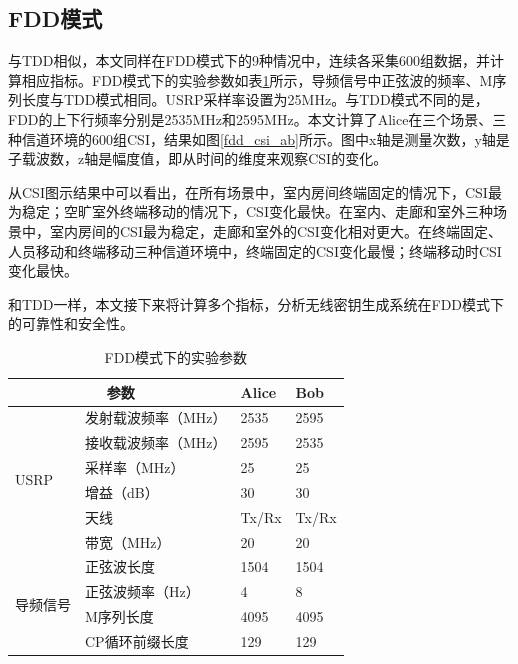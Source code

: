 \documentclass[master]{seuthesis} %
\begin{document}
\begin{Main}
\section{FDD模式}

与TDD相似，本文同样在FDD模式下的9种情况中，连续各采集600组数据，并计算相应指标。FDD模式下的实验参数如表\ref{fdd-exp-args}所示，导频信号中正弦波的频率、M序列长度与TDD模式相同。USRP采样率设置为25MHz。与TDD模式不同的是，FDD的上下行频率分别是2535MHz和2595MHz。本文计算了Alice在三个场景、三种信道环境的600组CSI，结果如图\ref{fdd_csi_ab}所示。图中x轴是测量次数，y轴是子载波数，z轴是幅度值，即从时间的维度来观察CSI的变化。

从CSI图示结果中可以看出，在所有场景中，室内房间终端固定的情况下，CSI最为稳定；空旷室外终端移动的情况下，CSI变化最快。在室内、走廊和室外三种场景中，室内房间的CSI最为稳定，走廊和室外的CSI变化相对更大。在终端固定、人员移动和终端移动三种信道环境中，终端固定的CSI变化最慢；终端移动时CSI变化最快。

和TDD一样，本文接下来将计算多个指标，分析无线密钥生成系统在FDD模式下的可靠性和安全性。

\begin{table}[]
    \centering
    \begin{tabular}{|l|l|l|l|}
    \hline
    \multicolumn{2}{|c|}{参数} & Alice & Bob \\ \hline
    \multirow{6}{*}{USRP} & 发射载波频率（MHz） & 2535 & 2595 \\ \cline{2-4} 
     & 接收载波频率（MHz） & 2595 & 2535 \\ \cline{2-4} 
     & 采样率（MHz） & 25 & 25 \\ \cline{2-4} 
     & 增益（dB） & 30 & 30 \\ \cline{2-4} 
     & 天线 & Tx/Rx & Tx/Rx \\ \cline{2-4} 
     & 带宽（MHz） & 20 & 20 \\ \hline
    \multirow{4}{*}{导频信号} & 正弦波长度 & 1504 & 1504 \\ \cline{2-4} 
     & 正弦波频率（Hz） & 4 & 8 \\ \cline{2-4} 
     & M序列长度 & 4095 & 4095 \\ \cline{2-4} 
     & CP循环前缀长度 & 129 & 129 \\ \hline
    \end{tabular}
    \caption{FDD模式下的实验参数
    \label{fdd-exp-args}}
\end{table}


\end{Main}
\end{document}

